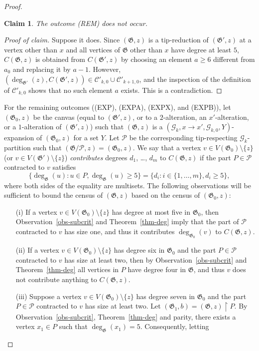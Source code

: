 \documentclass{article}
\newcommand{\PP}{\mathcal{P}}
\newcommand{\GG}{\mathcal{G}}
\newcommand{\CC}{\mathcal{C}}
\newcommand\g{\mathfrak{G}}
\newtheorem*{claim*}{Claim}
\newenvironment{subproof}{%
  \renewcommand{\qedsymbol}{$\blacksquare$}%
  \begin{proof}[Proof of claim]%
}{%
  \end{proof}%
}
\begin{document}
\begin{proof}
\begin{claim*}
The outcome (REM) does not occur.
\end{claim*}

\begin{subproof}
Suppose it does. Since $(\g,z)$ is a tip-reduction of $(\g',z)$
at a vertex other than $x$ and all vertices of $\g$ other than $x$ have degree at least $5$,
$C(\g,z)$ is obtained from $C(\g',z)$ by choosing an element $a\ge 6$ different from $a_0$ and replacing it by $a-1$.
However, $(\deg_{\g'}(z),C(\g',z))\in \CC'_{k,0}\cup \CC'_{k+1,0}$, and the inspection of the definition of $\CC'_{k,0}$ shows
that no such element $a$ exists.  This is a contradiction.
\end{subproof}

For the remaining outcomes ((EXP), (EXPA), (EXPX), and (EXPB)), let $(\g_0,z)$ be the canvas (equal to $(\g',z)$, or to
a $2$-alteration, an $x'$-alteration, or a $1$-alteration of $(\g',z)$) such that $(\g,z)$ is a $(\GG_k,x\to x',\GG_{k,0},Y)$-expansion of $(\g_0,z)$ for a set $Y$.
Let $\PP$ be the corresponding tip-respecting $\GG_k$-partition such that $(\g/\PP, z)=(\g_0,z)$.
We say that a vertex $v\in V(\g_0)\setminus\{z\}$ (or $v\in V(\g')\setminus\{z\}$) \emph{contributes} degrees $d_1$, \ldots, $d_m$
to $C(\g,z)$ if the part $P\in\PP$ contracted to $v$ satisfies
$$\{\deg_{\g}(u):u\in P,\deg_{\g}(u)\ge 5\}=\{d_i:i\in\{1,\ldots,m\}, d_i\ge 5\},$$
where both sides of the equality are multisets.
The following observations will be sufficient to bound the census of $(\g,z)$ based on the census of $(\g_0,z)$:
\begin{itemize}
\item[(i)] If a vertex $v\in V(\g_0)\setminus \{z\}$ has degree at most five in $\g_0$, then Observation~\ref{obs-subcrit} and Theorem~\ref{thm-deg}
imply that the part of $\PP$ contracted to $v$ has size one, and thus it contributes $\deg_{\g_0}(v)$ to $C(\g,z)$.
\item[(ii)] If a vertex $v\in V(\g_0)\setminus \{z\}$ has degree six in $\g_0$ and the part $P\in \PP$ contracted to $v$ has size at least two,
then by Observation~\ref{obs-subcrit} and Theorem~\ref{thm-deg} all vertices in $P$ have degree four in $\g$, and thus $v$
does not contribute anything to $C(\g,z)$.
\item[(iii)] Suppose a vertex $v\in V(\g_0)\setminus \{z\}$ has degree seven in $\g_0$ and the part $P\in \PP$ contracted to $v$ has size at least two.
Let $(\g_1,b)=(\g,z) \restriction P$.  By Observation~\ref{obs-subcrit}, Theorem~\ref{thm-deg} and parity, there exists a vertex $x_1\in P$ such that $\deg_{\g}(x_1)=5$.  Consequently, letting

\end{itemize}
\end{proof}
\end{document}
